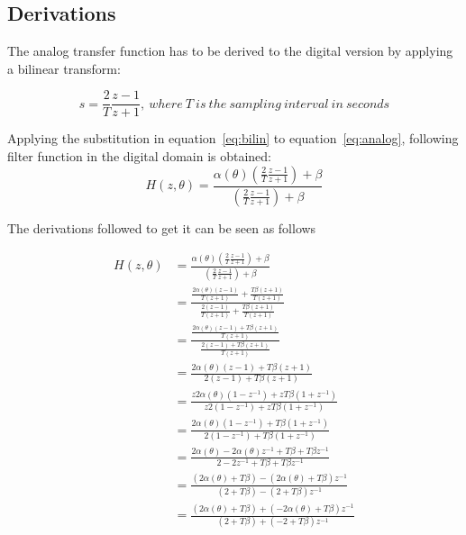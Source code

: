 \documentclass[journal]{IEEEtran}
\begin{document}
\pagebreak
\listoffigures
\listoftables
\pagebreak
\begin{appendices}
\section{Derivations}


The analog transfer function has to be derived to the digital version by applying a bilinear transform:

\begin{equation}\label{eq:bilin}
s = \frac{2}{T} \frac{z-1}{z+1},\: where\:T\:is\:the\:sampling\:interval\:in\:seconds
\end{equation}


Applying the substitution in equation~\ref{eq:bilin} to equation~\ref{eq:analog}, following filter function in the digital domain is obtained:
\begin{equation}\label{eq:filter}
H\left( z,\theta\right) = \frac{\alpha (\theta)(\frac{2}{T} \frac{z-1}{z+1})+\beta}{(\frac{2}{T} \frac{z-1}{z+1})+\beta}
\end{equation}

The derivations followed to get it can be seen as follows

\begin{equation*}\label{eq:DerivationFilterCoeff}
\begin{split}
H\left( z,\theta\right) &=\frac{\alpha (\theta)(\frac{2}{T} \frac{z-1}{z+1})+\beta}{(\frac{2}{T} \frac{z-1}{z+1})+\beta}\\
                                   &= \frac{\frac{2\alpha (\theta)(z-1)}{T(z+1)}+\frac{T\beta(z+1)}{T(z+1)}}{\frac{2(z-1)}{T(z+1)}+\frac{T\beta(z+1)}{T(z+1)}}\\  
			   &=\frac{\frac{2\alpha (\theta)(z-1)+T\beta(z+1)}{T(z+1)}}{\frac{2(z-1)+T\beta(z+1)}{T(z+1)}}\\
			  &=\frac{2\alpha (\theta)(z-1)+T\beta(z+1)}{2(z-1)+T\beta(z+1)}\\
			 &=\frac{z2\alpha (\theta)(1-z^{-1})+zT\beta(1+z^{-1})}{z2(1-z^{-1})+zT\beta(1+z^{-1})}\\
			&=\frac{2\alpha (\theta)(1-z^{-1})+T\beta(1+z^{-1})}{2(1-z^{-1})+T\beta(1+z^{-1})}\\
			&=\frac{2\alpha (\theta)-2\alpha (\theta)z^{-1}+T\beta+T\beta z^{-1}}{2-2z^{-1}+T\beta+T\beta z^{-1}}\\
			&=\frac{(2\alpha (\theta)+T\beta)-(2\alpha (\theta)+T\beta)z^{-1}}{(2+T\beta)-(2+T\beta)z^{-1}}\\
			&=\frac{(2\alpha (\theta)+T\beta)+(-2\alpha (\theta)+T\beta)z^{-1}}{(2+T\beta)+(-2+T\beta)z^{-1}}\\
\end{split}
\end{equation*} 



\end{appendices}
\end{document}
